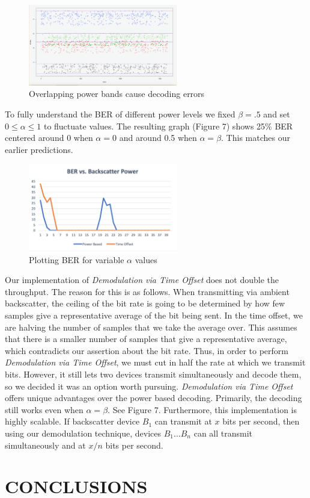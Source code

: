 \documentclass[letterpaper, 10 pt, conference]{IEEEconf}
\begin{document}
\begin{figure}[h!]
  \centerline{\includegraphics[width=65mm,scale=0.50]{Figure_6.png}}
  \caption{Overlapping power bands cause decoding errors}
\end{figure}

To fully understand the BER of different power levels we fixed $\beta = .5$ and set $0 \leq \alpha \leq 1$ to fluctuate values. The resulting graph (Figure 7) shows 25\% BER centered around 0 when $\alpha = 0$ and around 0.5 when $\alpha = \beta$. This matches our earlier predictions. 

\begin{figure}[h!]
  \centerline{\includegraphics[width=65mm,scale=0.50]{Figure_7.png}}
  \caption{Plotting BER for variable $\alpha$ values}
\end{figure}

Our implementation of \textit{Demodulation via Time Offset} does not double the throughput. The reason for this is as follows. When transmitting via ambient backscatter, the ceiling of the bit rate is going to be determined by how few samples give a representative average of the bit being sent. In the time offset, we are halving the number of samples that we take the average over. This assumes that there is a smaller number of samples that give a representative average, which contradicts our assertion about the bit rate. Thus, in order to perform \textit{Demodulation via Time Offset}, we must cut in half the rate at which we transmit bits. 
\newline
\newline
However, it still lets two devices transmit simultaneously and decode them, so we decided it was an option worth pursuing. \textit{Demodulation via Time Offset} offers unique advantages over the power based decoding. Primarily, the decoding still works even when $\alpha = \beta$. See Figure 7. Furthermore, this implementation is highly scalable. If backscatter device $B_1$ can transmit at $x$ bits per second, then using our demodulation technique, devices $B_1 \ldots B_n$ can all transmit simultaneously and at $x / n$ bits per second. 

\section{CONCLUSIONS}





{}

\end{document}
